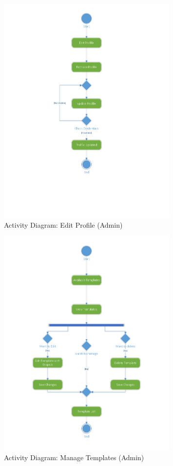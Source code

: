 \documentclass[12pt]{report}
\begin{document}
\begin{figure}[ht]
    \centering
    \includegraphics[width=0.8\textwidth]{Media/Binder2.pdf_Page_02.jpg} %
    \caption{Activity Diagram: Edit Profile (Admin)}
    \label{fig:drawing1}
\end{figure}

\begin{figure}[ht]
    \centering
    \includegraphics[width=0.8\textwidth]{Media/Binder2.pdf_Page_03.jpg} %
    \caption{Activity Diagram: Manage Templates (Admin)}
    \label{fig:drawing1}
\end{figure}
\end{document}
